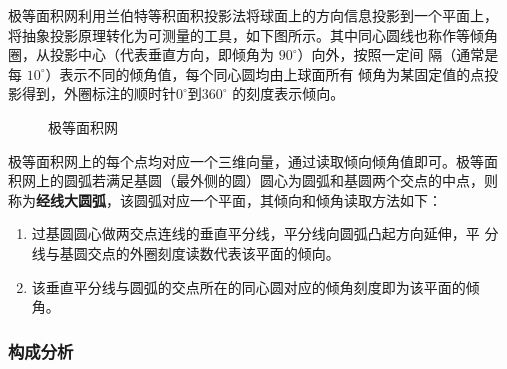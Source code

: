 \documentclass[a4paper,twoside]{ctexart}
\begin{document}
极等面积网利用兰伯特等积面积投影法将球面上的方向信息投影到一个平面上，
将抽象投影原理转化为可测量的工具，如下图所示。其中同心圆线也称作等倾角
圈，从投影中心（代表垂直方向，即倾角为 $90^{\circ}$）向外，按照一定间
隔（通常是每 $10^{\circ}$）表示不同的倾角值，每个同心圆均由上球面所有
倾角为某固定值的点投影得到，外圈标注的顺时针$0^{\circ}$到$360^{\circ}$
的刻度表示倾向。

  \begin{figure}[htbp]
  \centering
  \hspace{1cm}
  
  \caption{极等面积网}
  \label{fig:极等面积网}
\end{figure}

极等面积网上的每个点均对应一个三维向量，通过读取倾向倾角值即可。极等面
积网上的圆弧若满足基圆（最外侧的圆）圆心为圆弧和基圆两个交点的中点，则
称为\textbf{经线大圆弧}，该圆弧对应一个平面，其倾向和倾角读取方法如下：
\begin{enumerate}[步骤1：]
\item 过基圆圆心做两交点连线的垂直平分线，平分线向圆弧凸起方向延伸，平
  分线与基圆交点的外圈刻度读数代表该平面的倾向。
\item 该垂直平分线与圆弧的交点所在的同心圆对应的倾角刻度即为该平面的倾
  角。
\end{enumerate}



\subsubsection{构成分析}
\label{sec:构成分析}
\end{document}
